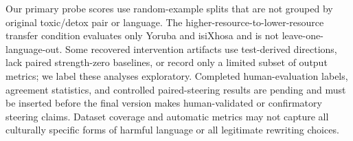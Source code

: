 Our primary probe scores use random-example splits that are not grouped by original
toxic/detox pair or language. The higher-resource-to-lower-resource transfer condition
evaluates only Yoruba and isiXhosa and is not leave-one-language-out. Some recovered
intervention artifacts use test-derived directions, lack paired strength-zero baselines,
or record only a limited subset of output metrics; we label these analyses exploratory.
Completed human-evaluation labels, agreement statistics, and controlled paired-steering
results are pending and must be inserted before the final version makes human-validated
or confirmatory steering claims. Dataset coverage and automatic metrics may not capture
all culturally specific forms of harmful language or all legitimate rewriting choices.
